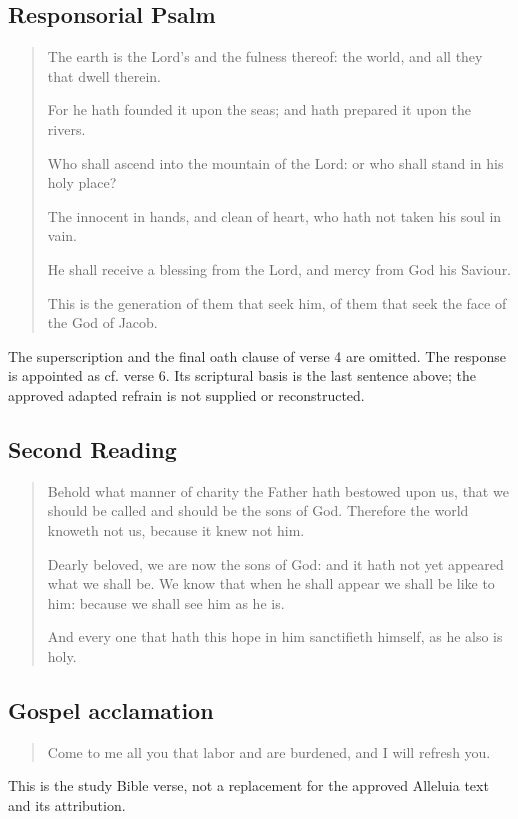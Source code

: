 \subsection{Responsorial Psalm}
\label{proper-responsorial-psalm}
\begin{quote}
The earth is the Lord’s and the fulness thereof: the world, and all they that dwell therein.

For he hath founded it upon the seas; and hath prepared it upon the rivers.

Who shall ascend into the mountain of the Lord: or who shall stand in his holy place?

The innocent in hands, and clean of heart, who hath not taken his soul in vain.

He shall receive a blessing from the Lord, and mercy from God his Saviour.

This is the generation of them that seek him, of them that seek the face of the God of Jacob.
\end{quote}
The superscription and the final oath clause of verse 4 are omitted. The response is appointed as cf. verse 6. Its scriptural basis is the last sentence above; the approved adapted refrain is not supplied or reconstructed.

\subsection{Second Reading}
\label{proper-second-reading}
\begin{quote}
Behold what manner of charity the Father hath bestowed upon us, that we should be called and should be the sons of God. Therefore the world knoweth not us, because it knew not him.

Dearly beloved, we are now the sons of God: and it hath not yet appeared what we shall be. We know that when he shall appear we shall be like to him: because we shall see him as he is.

And every one that hath this hope in him sanctifieth himself, as he also is holy.
\end{quote}

\subsection{Gospel acclamation}
\label{proper-gospel-acclamation}
\begin{quote}
Come to me all you that labor and are burdened, and I will refresh you.
\end{quote}
This is the study Bible verse, not a replacement for the approved Alleluia text and its attribution.

